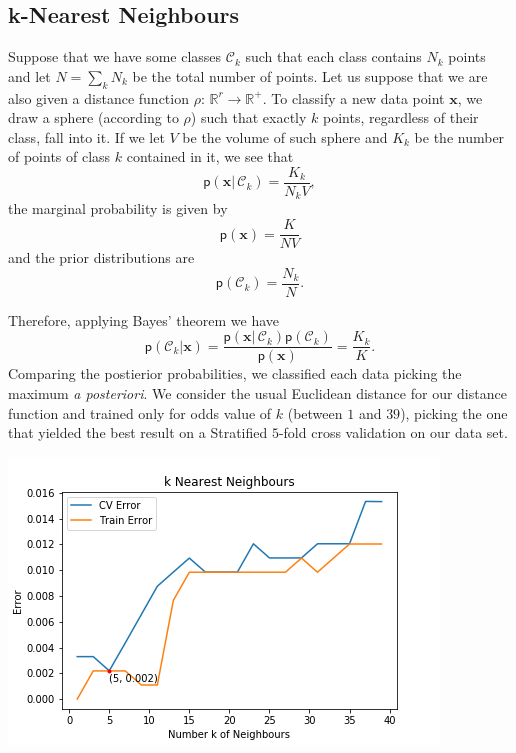 \documentclass[a4paper]{article}
\begin{document}
\subsection{k-Nearest Neighbours}

Suppose that we have some classes $\mathcal{C}_{k}$ such that each
class contains $N_{k}$ points and let $N=\sum_{k}N_{k}$ be the total
number of points. Let us suppose that we are also given a distance
function $\rho:\,\mathbb{R}^{r}\rightarrow\mathbb{R}^{+}$. To classify
a new data point $\mathbf{x}$, we draw a sphere (according to $\rho$)
such that exactly $k$ points, regardless of their class, fall into
it. If we let $V$ be the volume of such sphere and $K_{k}$ be the
number of points of class $k$ contained in it, we see that 
\begin{equation}
\mathsf{p}\left(\mathbf{x}|\,\mathcal{C}_{k}\right)=\frac{K_{k}}{N_{k}V},\label{eq:-10}
\end{equation}
the marginal probability is given by 
\begin{equation}
\mathsf{p}\left(\mathbf{x}\right)=\frac{K}{NV}\label{eq:-11}
\end{equation}
and the prior distributions are 
\begin{equation}
\mathsf{p}\left(\mathcal{C}_{k}\right)=\frac{N_{k}}{N}.\label{eq:-12}
\end{equation}

Therefore, applying Bayes' theorem we have 
\begin{equation}
\mathsf{p}\left(\mathcal{C}_{k}|\mathbf{x}\right)=\frac{\mathsf{p}\left(\mathbf{x}|\,\mathcal{C}_{k}\right)\mathsf{p}\left(\mathcal{C}_{k}\right)}{\mathsf{p}\left(\mathbf{x}\right)}=\frac{K_{k}}{K}.\label{eq:-13}
\end{equation}
Comparing the postierior probabilities, we classified each data picking
the maximum \textit{a posteriori}. We consider the usual Euclidean
distance for our distance function and trained only for odds value
of $k$ (between $1$ and $39$), picking the one that yielded the
best result on a Stratified $5$-fold cross validation on our data
set.

\includegraphics{Best K value - K-nearest Neighbours.png}
\end{document}
